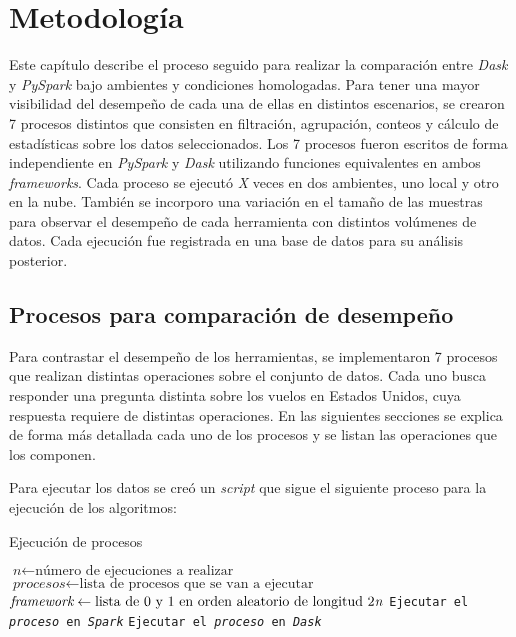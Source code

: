 \chapter{Metodología}

\noindent Este capítulo describe el proceso seguido para realizar la comparación entre \textit{Dask} y \textit{PySpark} bajo ambientes y condiciones homologadas. Para tener una mayor visibilidad del desempeño de cada una de ellas en distintos escenarios, se crearon 7 procesos distintos que consisten en filtración, agrupación, conteos y cálculo de estadísticas sobre los datos seleccionados. Los 7 procesos fueron escritos de forma independiente en \textit{PySpark} y \textit{Dask} utilizando funciones equivalentes en ambos \textit{frameworks}. Cada proceso se ejecutó \textit{\LARGE X} veces en dos ambientes, uno local y otro en la nube. También se incorporo una variación en el tamaño de las muestras para observar el desempeño de cada herramienta con distintos volúmenes de datos. Cada ejecución fue registrada en una base de datos para su análisis posterior. 
\newpage

\section{Procesos para comparación de desempeño}

Para contrastar el desempeño de los herramientas, se implementaron 7 procesos que realizan distintas operaciones sobre el conjunto de datos. Cada uno busca responder una pregunta distinta sobre los vuelos en Estados Unidos, cuya respuesta requiere de distintas operaciones. En las siguientes secciones se explica de forma más detallada cada uno de los procesos y se listan las operaciones que los componen.

Para ejecutar los datos se creó un \textit{script} que sigue el siguiente proceso para la ejecución de los algoritmos:

\begin{algorithm}[H]
\caption{Ejecución de procesos}\label{ejecucion_procesos}
\begin{algorithmic}[1]
\State $\textit{n} \gets \text{número de ejecuciones a realizar}$
\State $\textit{procesos} \gets \text{lista de procesos que se van a ejecutar}$
	\State $\textit{framework} \gets \text{lista de 0 y 1 en orden aleatorio de longitud 2\textit{n}}$
		\State \texttt{Ejecutar el \textit{proceso} en \textit{Spark}}
		\Else
		\State \texttt{Ejecutar el \textit{proceso} en \textit{Dask}}
		\EndIf
	\EndFor
\EndFor
\EndProcedure
\end{algorithmic}
\end{algorithm}

